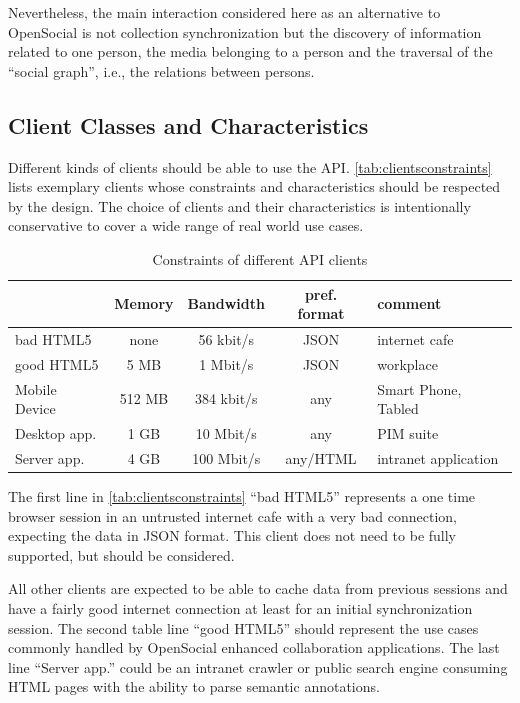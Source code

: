 \documentclass[11pt,a4paper,headsepline,twoside]{scrartcl}		%
\begin{document}
Nevertheless, the main interaction considered here as an alternative to
OpenSocial is not collection synchronization but the discovery of information
related to one person, the media belonging to a person and the traversal of the
``social graph'', i.e., the relations between persons.

\subsection{Client Classes and Characteristics}
\label{sec:user-class-char}

Different kinds of clients should be able to use the API.
\autoref{tab:clientsconstraints} lists exemplary clients whose constraints and
characteristics should be respected by the design. The choice of clients and
their characteristics is intentionally conservative to cover a wide range of
real world use cases.

\begin{table}[tbh]
  \centering
  \begin{tabular}[tbh]{ l || c | c | c | l }
                & Memory & Bandwidth & pref. format & comment \\  \hline
  bad HTML5 & none & 56 kbit/s & JSON & internet cafe\\
  good HTML5 & 5 MB & 1 Mbit/s & JSON & workplace\\
  Mobile Device &  512 MB & 384 kbit/s & any & Smart Phone, Tabled \\ 
  Desktop app. &  1 GB & 10 Mbit/s  & any & PIM suite \\
  Server app.  &  4 GB & 100 Mbit/s & any/HTML & intranet application \\
  \end{tabular}
  \caption{Constraints of different API clients}
  \label{tab:clientsconstraints}
\end{table}

The first line in \autoref{tab:clientsconstraints} ``bad HTML5'' represents a
one time browser session in an untrusted internet cafe with a very bad
connection, expecting the data in JSON format. This client does not need to be
fully supported, but should be considered.

All other clients are expected to be able to cache data from previous sessions
and have a fairly good internet connection at least for an initial
synchronization session. The second table line ``good HTML5'' should represent
the use cases commonly handled by OpenSocial enhanced collaboration
applications. The last line ``Server app.'' could be an intranet crawler or
public search engine consuming HTML pages with the ability to parse semantic
annotations.
\end{document}
